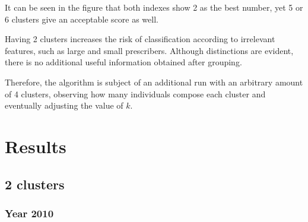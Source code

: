 It can be seen in the figure that both indexes show 2 as the best number, yet 5 or 6 clusters give an acceptable score as well.

Having 2 clusters increases the risk of classification according to irrelevant features, such as large and small prescribers. Although distinctions are evident, there is no additional useful information obtained after grouping. 

Therefore, the algorithm is subject of an additional run with an arbitrary amount of 4 clusters, observing how many individuals compose each cluster and eventually adjusting the value of $k$.

\section{Results}

\subsection{2 clusters} 

\subsubsection{Year 2010}
\begin{center}
	\begin{table}[h]
\caption{\small $k$-means with 2 clusters, 2010, Campania Millennium database}
\vspace{-30px}
\end{table}
\end{center}
\medskip


